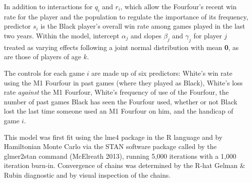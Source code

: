 \documentclass[reqno,12pt]{amsart}
\begin{document}
In addition to interactions for $q_i$ and $r_i$, which allow the Fourfour's recent win rate for the player and the population to regulate the importance of its frequency, predictor $s_i$ is the Black player's overall win rate among games played in the last two years. Within the model, intercept $\alpha_j$ and slopes $\beta_j$ and $\gamma_j$ for player $j$ treated as varying effects following a joint normal distribution with mean \textbf{0}, as are those of players of age $k$.

The controls for each game $i$ are made up of six predictors: White's win rate using the M1 Fourfour in past games (where they played as Black), White's loss rate \textit{against} the M1 Fourfour, White's frequency of use of the Fourfour, the number of past games Black has seen the Fourfour used, whether or not Black lost the last time someone used an M1 Fourfour on him, and the handicap of game $i$.

This model was first fit using the lme4 package in the R language and by Hamiltonian Monte Carlo via the STAN software package called by the glmer2stan command (McElreath 2013), running 5,000 iterations with a 1,000 iteration burn-in. Convergence of chains was determined by the R-hat Gelman \& Rubin diagnostic \citep{stan2013stan} and by visual inspection of the chains.
\end{document}
